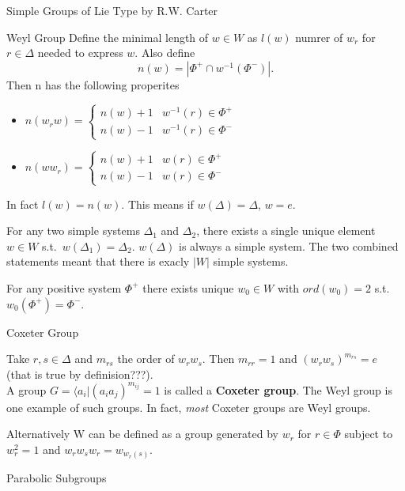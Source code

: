 \documentclass[12pt, letterpaper]{article}
\begin{document}
\begin{section}{Simple Groups of Lie Type by R.W. Carter}
\begin{subsection}{Weyl Group}
    Define the minimal length of \(w \in W\) as \(l(w)\) numrer of \(w_{r}\) for
    \(r \in \Delta\) needed to express \(w\). Also
    define \[n(w) = | \Phi^{+} \cap w^{-1}(\Phi^{-})|.\] Then n has the
    following properites
    \begin{itemize}
      \item \(n(w_{r}w) =
            \begin{cases}
              n(w) + 1 & w^{-1}(r) \in \Phi^{+} \\
              n(w) - 1 & w^{-1}(r) \in \Phi^{-}
            \end{cases}\)
      \item \(n(ww_{r}) =
            \begin{cases}
              n(w) + 1 & w(r) \in \Phi^{+} \\
              n(w) - 1 & w(r) \in \Phi^{-}
            \end{cases}\)
    \end{itemize}

    In fact \(l(w) = n(w)\). This means if \(w(\Delta) = \Delta\), \(w = e\).

    For any two simple systems \(\Delta_{1}\) and \(\Delta_{2}\), there exists a
    single unique element \(w \in W\) s.t.\ \(w(\Delta_{1}) = \Delta_{2}\).
    \(w(\Delta)\) is always a simple system. The two combined statements meant
    that there is exacly \(|W|\) simple systems.

    For any positive system \(\Phi^{+}\) there exists unique \(w_{0} \in W\)
    with \(ord(w_{0}) = 2\) s.t.\ \(w_{0}(\Phi^{+}) = \Phi^{-}\).

    \begin{subsubsection}{Coxeter Group}

      Take \(r, s \in \Delta\) and \(m_{rs}\) the order of \(w_{r}w_{s}\). Then
      \(m_{rr} = 1\) and \((w_{r}w_{s})^{m_{rs}} = e\) (that is true by
      definision???). \\
      A group \(G = \langle a_{i} | (a_{i}a_{j})^{m_{ij}} = 1\) is called a
      \textbf{Coxeter group}. The Weyl group is one example of such groups. In
      fact, \textit{most} Coxeter groups are Weyl groups.

      Alternatively W can be defined as a group generated by \(w_{r}\) for
      \(r \in \Phi\) subject to \(w^{2}_{r} = 1\) and
      \(w_{r}w_{s}w_{r} = w_{w_{r}(s)}\).

    \end{subsubsection}

    \begin{subsubsection}{Parabolic Subgroups}


\end{subsubsection}
\end{subsection}
\end{section}
\end{document}

